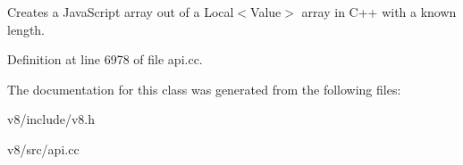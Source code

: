 Creates a Java\+Script array out of a Local$<$\+Value$>$ array in C++ with a known length. 

Definition at line 6978 of file api.\+cc.



The documentation for this class was generated from the following files\+:\begin{DoxyCompactItemize}
\item 
v8/include/v8.\+h\item 
v8/src/api.\+cc\end{DoxyCompactItemize}
